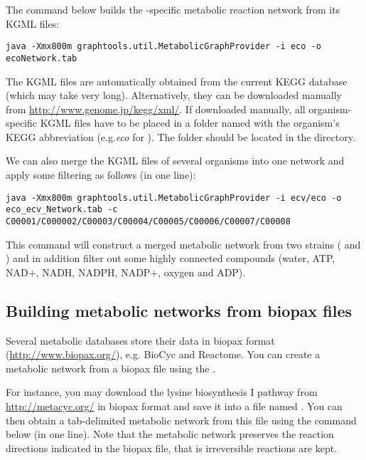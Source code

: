 
The command below builds the -specific metabolic reaction network
from its KGML files:

\begin{lstlisting}
java -Xmx800m graphtools.util.MetabolicGraphProvider -i eco -o ecoNetwork.tab
\end{lstlisting}

The KGML files are automatically obtained from the current KEGG database
(which may take very long). Alternatively, they can be downloaded manually from
\url{http://www.genome.jp/kegg/xml/}.
If downloaded manually, all organism-specific KGML files have to be placed in a
folder named with the organism's KEGG abbreviation (e.g.\textit{eco}
for ). The folder should be located in the 
directory.
 
We can also merge the KGML files of several organisms into one network and apply
some filtering as follows (in one line):

\begin{lstlisting}
java -Xmx800m graphtools.util.MetabolicGraphProvider -i ecv/eco -o
eco_ecv_Network.tab -c C00001/C000002/C00003/C00004/C00005/C00006/C00007/C00008
\end{lstlisting}

This command will construct a merged metabolic network from two
 strains ( and ) 
and in addition filter out some highly connected compounds 
(water, ATP, NAD+, NADH, NADPH, NADP+, oxygen and ADP).

\subsection{Building metabolic networks from biopax files}

Several metabolic databases store their data in biopax format
(\url{http://www.biopax.org/}), e.g. BioCyc and Reactome. You can create
a metabolic network from a biopax file using the
.

For instance, you may download the lysine biosynthesis I pathway from
\url{http://metacyc.org/} in biopax format and save it into a file named
. You can then obtain a tab-delimited metabolic network
from this file using the command below (in one line). Note that the metabolic
network preserves the reaction directions indicated in the biopax file, that is irreversible reactions are
kept.

